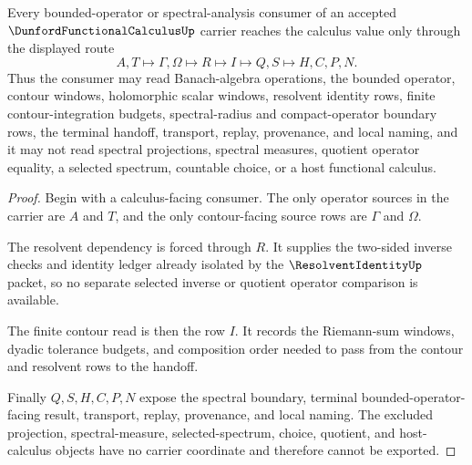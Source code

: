 \begin{theorem}
\label{thm:dunford-functional-calculus-resolvent-contour-handoff}
Every bounded-operator or spectral-analysis consumer of an accepted $\DunfordFunctionalCalculusUp$ carrier reaches the calculus value only through the displayed route
$$
A,T \longmapsto \Gamma,\Omega \longmapsto R \longmapsto I \longmapsto Q,S \longmapsto H,C,P,N .
$$
Thus the consumer may read Banach-algebra operations, the bounded operator, contour windows, holomorphic scalar windows, resolvent identity rows, finite contour-integration budgets, spectral-radius and compact-operator boundary rows, the terminal handoff, transport, replay, provenance, and local naming, and it may not read spectral projections, spectral measures, quotient operator equality, a selected spectrum, countable choice, or a host functional calculus.
\end{theorem}
\begin{proof}
Begin with a calculus-facing consumer. The only operator sources in the carrier are $A$ and $T$, and the only contour-facing source rows are $\Gamma$ and $\Omega$.

The resolvent dependency is forced through $R$. It supplies the two-sided inverse checks and identity ledger already isolated by the $\ResolventIdentityUp$ packet, so no separate selected inverse or quotient operator comparison is available.

The finite contour read is then the row $I$. It records the Riemann-sum windows, dyadic tolerance budgets, and composition order needed to pass from the contour and resolvent rows to the handoff.

Finally $Q,S,H,C,P,N$ expose the spectral boundary, terminal bounded-operator-facing result, transport, replay, provenance, and local naming. The excluded projection, spectral-measure, selected-spectrum, choice, quotient, and host-calculus objects have no carrier coordinate and therefore cannot be exported.
\end{proof}


